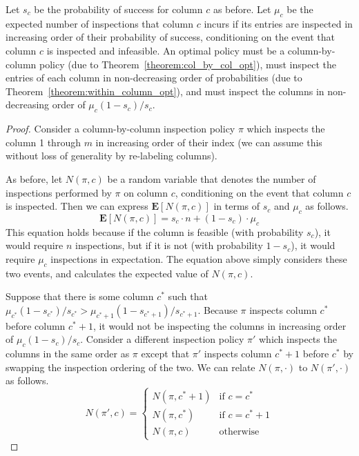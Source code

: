  \begin{theorem} \label{thm:main_result}
 	Let $s_c$ be the probability of success for column $c$ as before. 
 	Let $\mu_c$ be the expected number of inspections that column $c$ incurs if its entries are inspected in increasing order of their probability of success, conditioning on the event that column $c$ is inspected and infeasible.
 	An optimal policy must be a column-by-column policy (due to Theorem~\ref{theorem:col_by_col_opt}), must inspect the entries of each column in non-decreasing order of probabilities (due to Theorem~\ref{theorem:within_column_opt}), and must inspect the columns in non-decreasing order of $\mu_c(1 - s_c)/s_c$.
 \end{theorem}
 \begin{proof}
 	Consider a column-by-column inspection policy $\pi$ which inspects the column 1 through $m$ in increasing order of their index (we can assume this without loss of generality by re-labeling columns).
	
 	As before, let $N(\pi,c)$ be a random variable that denotes the number of inspections performed by $\pi$ on column $c$, conditioning on the event that column $c$ is inspected.
 	Then we can express $\mathbf{E}[N(\pi, c)]$ in terms of $s_c$ and $\mu_c$ as follows.
 	\begin{equation}\label{eqn:exp_cost_column_by_condition}
 		\mathbf{E}[N(\pi, c)] = s_c \cdot n  + (1-s_c) \cdot \mu_c
 	\end{equation}
 	This equation holds because if the column is feasible (with probability $s_c$), it would require $n$ inspections, but if it is not (with probability $1-s_c$), it would require $\mu_c$ inspections in expectation. The equation above simply considers these two events, and calculates the expected value of $N(\pi, c)$. 
	
 	Suppose that there is some column $c^*$ such that $\mu_{c^*}(1 - s_{c^*}) / s_{c^*} > \mu_{c^*+1} (1 - s_{c^*+1}) / s_{c^*+1}$. Because $\pi$ inspects column $c^*$ before column $c^*+1$, it would not be inspecting the columns in increasing order of $\mu_c(1-s_c)/s_c$.
 	Consider a different inspection policy $\pi'$ which inspects the columns in the same order as $\pi$ except that $\pi'$ inspects column $c^*+1$ before $c^*$ by swapping the inspection ordering of the two.
 	We can relate $N(\pi, \cdot)$ to $N(\pi', \cdot)$ as follows.
 	\begin{equation*}
 		N(\pi', c) = 
 		\begin{cases}
 			N(\pi, c^*+1) & \mbox{if~} c = c^* \\
 			N(\pi, c^*)   & \mbox{if~} c = c^* + 1 \\
 			N(\pi, c)     & \mbox{otherwise}
 		\end{cases}
 	\end{equation*}
	

\end{proof}
